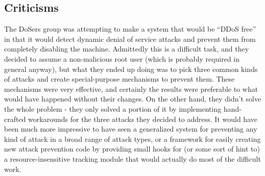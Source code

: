 \subsection{Criticisms}
\label{sec:groups:critic}

The DoSers group was attempting to make a system that would be ``DDoS free'' in
that it would detect dynamic denial of service attacks and prevent them from
completely disabling the machine. Admittedly this is a difficult task, and they
decided to assume a non-malicious root user (which is probably required in
general anyway), but what they ended up doing was to pick three common kinds of
attacks and create special-purpose mechanisms to prevent them. These mechanisms
were very effective, and certainly the results were preferable to what would
have happened without their changes. On the other hand, they didn't solve the
whole problem - they only solved a portion of it by implementing hand-crafted
workarounds for the three attacks they decided to address. It would have been
much more impressive to have seen a generalized system for preventing any kind
of attack in a broad range of attack types, or a framework for easily creating
new attack prevention code by providing small hooks for (or some sort of hint
to) a resource-insensitive tracking module that would actually do most of the
difficult work.
